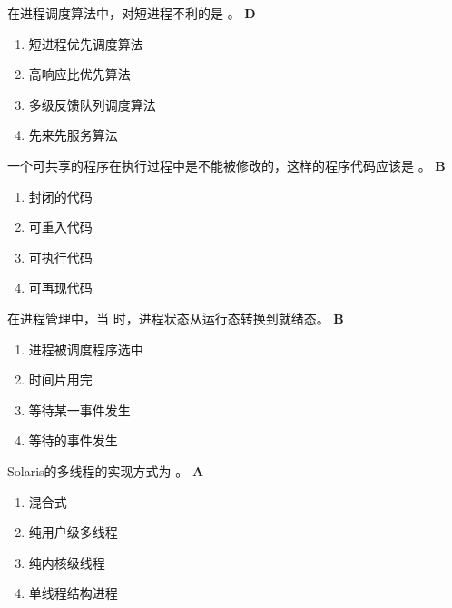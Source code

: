 \begin{problem}
	在进程调度算法中，对短进程不利的是 \myline。
	\textbf{D}
	\vspace{-0.5em}
	\begin{multicols}{2}
		\begin{enumerate}[label=\Alph*.]
			\item 短进程优先调度算法
			\item 高响应比优先算法
			\item 多级反馈队列调度算法
			\item 先来先服务算法
		\end{enumerate}
	\end{multicols}
	\vspace{-1em}
\end{problem}


\begin{problem}
	一个可共享的程序在执行过程中是不能被修改的，这样的程序代码应该是 \myline。
	\textbf{B}
	\vspace{-0.5em}
	\begin{multicols}{4}
		\begin{enumerate}[label=\Alph*.]
			\item 封闭的代码
			\item 可重入代码
			\item 可执行代码
			\item 可再现代码
		\end{enumerate}
	\end{multicols}
	\vspace{-1em}
\end{problem}


\begin{problem}
	在进程管理中，当 \myline 时，进程状态从运行态转换到就绪态。
	\textbf{B}
	\vspace{-0.5em}
	\begin{multicols}{2}
		\begin{enumerate}[label=\Alph*.]
			\item 进程被调度程序选中
			\item 时间片用完
			\item 等待某一事件发生
			\item 等待的事件发生
		\end{enumerate}
	\end{multicols}
	\vspace{-1em}
\end{problem}


\begin{problem}
	Solaris的多线程的实现方式为 \myline。
	\textbf{A}
	\vspace{-0.5em}
	\begin{multicols}{4}
		\begin{enumerate}[label=\Alph*.]
			\item 混合式
			\item 纯用户级多线程
			\item 纯内核级线程
			\item 单线程结构进程
		\end{enumerate}
	\end{multicols}
	\vspace{-1em}
\end{problem}



